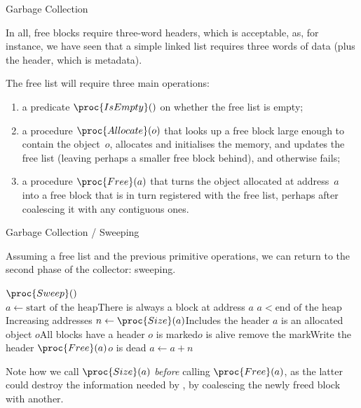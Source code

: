 \documentclass[compress,dvipdfmx]{beamer}
\begin{document}
%
\begin{frame}{Garbage Collection}

  In all, free blocks require three-word headers, which is acceptable,
  as, for instance, we have seen that a simple linked list requires
  three words of data (plus the header, which is metadata).

  \bigskip

  The free list will require three main operations:
  \begin{enumerate}

    \item a predicate \(\proc{IsEmpty}()\) on whether the free list is
      empty;

    \item a procedure \(\proc{Allocate}(o)\) that looks up a free
      block large enough to contain the object~\(o\), allocates and
      initialises the memory, and updates the free list (leaving
      perhaps a smaller free block behind), and otherwise fails;

    \item a procedure \(\proc{Free}(a)\) that turns the object
      allocated at address~\(a\) into a free block that is in turn
      registered with the free list, perhaps after coalescing it with
      any contiguous ones.

  \end{enumerate}

\end{frame}

%
\begin{frame}{Garbage Collection / Sweeping}

  Assuming a free list and the previous primitive operations, we can
  return to the second phase of the collector: sweeping.
  \begin{codebox}
    \(\proc{Sweep}()\)\\
    \li \(a \gets \text{start of the heap}\)\RComment There is always a
    block at address \(a\)
    \li \While \(a < \text{end of the heap}\) \RComment
    Increasing addresses
    \li \> \(n \gets \proc{Size}(a)\)\RComment Includes the header
    \li \> \If \(a\) is an allocated object \(o\)\RComment All blocks
    have a header
    \li    \Then \If \(o\) is marked\RComment \(o\) is alive
    \li          \Then remove the mark\RComment Write the header
    \li          \Else \(\proc{Free}(a)\)\RComment \(o\) is dead
                 \End
           \End
    \li \> \(a \gets a + n\)
  \end{codebox}
  Note how we call \(\proc{Size}(a)\) \emph{before} calling
  \(\proc{Free}(a)\), as the latter could destroy the information
  needed by , by coalescing the newly freed block with
  another.

\end{frame}
\end{document}
